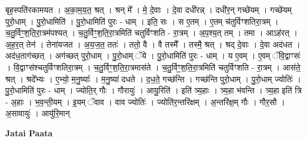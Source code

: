 \documentclass[17pt]{extarticle}
\begin{document}
बृह॒स्पति॑रकामयत । अ॒का॒म॒य॒त॒ श्रत् । श्रन् मे᳚ । मे॒ दे॒वाः । दे॒वा दधी॑रन्न् । दधी॑र॒न् गच्छे॑यम् । गच्छे॑यम् पुरो॒धाम् । पु॒रो॒धामिति॑ । पु॒रो॒धामिति॑ पुरः - धाम् । इति॒ सः । स ए॒तम् । ए॒तम् च॑तुर्विꣳशतिरा॒त्रम् । च॒तु॒र्विꣳ॒॒श॒ति॒रा॒त्रम॑पश्यत् । च॒तु॒र्विꣳ॒॒श॒ति॒रा॒त्रमिति॑ चतुर्विꣳशति - रा॒त्रम् । अ॒प॒श्य॒त् तम् । तमा । 
आऽह॑रत् । अ॒ह॒र॒त् तेन॑ । तेना॑यजत । अ॒य॒ज॒त॒ ततः॑ । ततो॒ वै । वै तस्मै᳚ । तस्मै॒ श्रत् । श्रद् दे॒वाः । दे॒वा अद॑धत । अद॑ध॒ताग॑च्छत् । अग॑च्छत् पुरो॒धाम् । पु॒रो॒धाम् ॅये । पु॒रो॒धामिति॑ पुरः - धाम् । य ए॒वम् । ए॒वम् ॅवि॒द्वाꣳसः॑ । वि॒द्वाꣳस॑श्चतुर्विꣳशतिरा॒त्रम् । च॒तु॒र्विꣳ॒॒श॒ति॒रा॒त्रमास॑ते । च॒तु॒र्विꣳ॒॒श॒ति॒रा॒त्रमिति॑ चतुर्विꣳशति - रा॒त्रम् । आस॑ते॒ श्रत् । श्रदे᳚भ्यः । ए॒भ्यो॒ म॒नु॒ष्याः᳚ । म॒नु॒ष्या॑ दधते । द॒ध॒ते॒ गच्छ॑न्ति । गच्छ॑न्ति पुरो॒धाम् । पु॒रो॒धाम् ज्योतिः॑ । पु॒रो॒धामिति॑ पुरः - धाम् । ज्योति॒र् गौः । गौरायुः॑ । आयु॒रिति॑ । इति॑ त्र्य॒हाः । त्र्य॒हा भ॑वन्ति । त्र्य॒हा इति॑ त्रि - अ॒हाः । भ॒व॒न्ती॒यम् । इ॒यम् ॅवाव । वाव ज्योतिः॑ । ज्योति॑र॒न्तरि॑क्षम् । अ॒न्तरि॑क्ष॒म् गौः । गौर॒सौ । अ॒सावायुः॑ । आयु॑रि॒मान् \newline

\textbf{Jatai Paata} \newline
\end{document}
